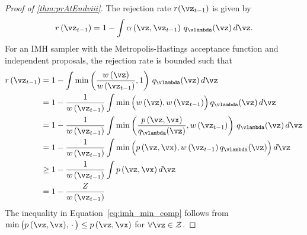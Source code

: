 \label{proofsection:prAtEndviii}\begin{proof}[Proof of \autoref{thm:prAtEndviii}]\label{proof:prAtEndviii}The rejection rate \(r(\vz _{t-1})\) is given by \begin {align} r\,(\vz _{t-1}) = 1 - \int \alpha \left (\vz , \vz _{t-1} \right ) \, q_{\vlambda }(\vz ) \, d\vz . \end {align} For an IMH sampler with the Metropolis-Hastings acceptance function and independent proposals, the rejection rate is bounded such that \begin {align} r\,(\vz _{t-1}) &= 1 - \int \min \left (\frac {w\,(\vz )}{w\,(\vz _{t-1})}, 1 \right ) \, q_{\vlambda }(\vz )\,d\vz \\ &= 1 - \frac {1}{w\,(\vz _{t-1})} \int \min \Big (w\,(\vz ), w\,(\vz _{t-1})\Big ) \, q_{\vlambda }(\vz )\,d\vz \\ &= 1 - \frac {1}{w\,(\vz _{t-1})} \int \min \left (\frac {p\,(\vz ,\vx )}{q_{\vlambda }(\vz )}, w\,(\vz _{t-1})\right ) \, q_{\vlambda }(\vz )\,d\vz \\ &= 1 - \frac {1}{w\,(\vz _{t-1})} \int \min \Big (p\,(\vz ,\vx ), w\,(\vz _{t-1})\,q_{\vlambda }(\vz )\Big ) \, d\vz \\ &\geq 1 - \frac {1}{w\,(\vz _{t-1})} \int p\,(\vz ,\vx ) \, d\vz \label {eq:imh_min_comp} \\ &= 1 - \frac {Z}{w\,(\vz _{t-1})} \end {align} The inequality in Equation~\eqref {eq:imh_min_comp} follows from \(\min \big (p\,(\vz ,\vx ), \,\cdot \, \big ) \leq p\,(\vz ,\vx ) \) for \(\forall \vz \in \mathcal {Z}\).\end{proof}
